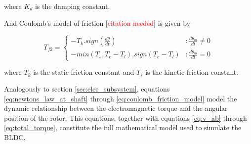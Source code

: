 \documentclass{article}
\begin{document}
    where $K_d$ is the damping constant.

    And Coulomb's model of friction [\textcolor{red}{citation needed}] is given by

    \begin{equation}
       T_{f2} = \left\{
         \begin{array}{lr}
           -T_k.sign(\frac{d\theta}{dt}) & : \frac{d\theta_m}{dt} \neq 0\\
           -min(T_s,T_e-T_l).sign(T_e-T_l) & : \frac{d\theta_m}{dt} = 0
         \end{array}
       \right.
       \label{eq:coulomb_friction_model}
    \end{equation}

    where $T_k$ is the static friction constant and $T_s$ is the kinetic friction constant.

    Analogously to section \ref{sec:elec_subsystem}, equations \ref{eq:newtons_law_at_shaft} through \ref{eq:coulomb_friction_model} model the dynamic relationship between the electromagnetic torque and the angular position of the rotor. This equations, together with equations \ref{eq:v_ab} through \ref{eq:total_torque}, constitute the full mathematical model used to simulate the BLDC. 


    
    
\end{document}
